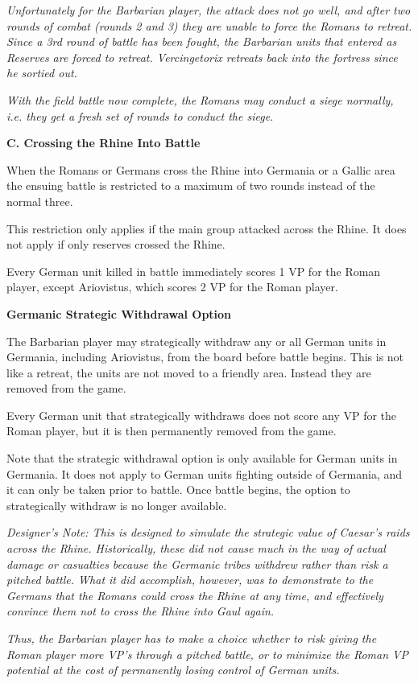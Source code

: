 \textit{Unfortunately for the Barbarian player, the attack does not go well, and after two rounds of combat (rounds 2 and 3) they are unable to force the Romans to retreat. Since a 3rd round of battle has been fought, the Barbarian units that entered as Reserves are forced to retreat. Vercingetorix retreats back into the fortress since he sortied out.}

\textit{With the field battle now complete, the Romans may conduct a siege normally, i.e. they get a fresh set of rounds to conduct the siege.}

\textbf{C. Crossing the Rhine Into Battle}
\par
When the Romans or Germans cross the Rhine into Germania or a Gallic area the ensuing battle is restricted to a maximum of two rounds instead of the normal three.

This restriction only applies if the main group attacked across the Rhine. It does not apply if only reserves crossed the Rhine.

Every German unit killed in battle immediately scores 1 VP for the Roman player, except Ariovistus, which scores 2 VP for the Roman player.

\textbf{Germanic Strategic Withdrawal Option}
\par
The Barbarian player may strategically withdraw any or all German units in Germania, including Ariovistus, from the board before battle begins. This is not like a retreat, the units are not moved to a friendly area. Instead they are removed from the game.

Every German unit that strategically withdraws does not score any VP for the Roman player, but it is then permanently removed from the game.

Note that the strategic withdrawal option is only available for German units in Germania. It does not apply to German units fighting outside of Germania, and it can only be taken prior to battle. Once battle begins, the option to strategically withdraw is no longer available.

\textit{Designer's Note: This is designed to simulate the strategic value of Caesar's raids across the Rhine. Historically, these did not cause much in the way of actual damage or casualties because the Germanic tribes withdrew rather than risk a pitched battle. What it did accomplish, however, was to demonstrate to the Germans that the Romans could cross the Rhine at any time, and effectively convince them not to cross the Rhine into Gaul again.}
\par
\textit{Thus, the Barbarian player has to make a choice whether to risk giving the Roman player more VP's through a pitched battle, or to minimize the Roman VP potential at the cost of permanently losing control of German units.}

